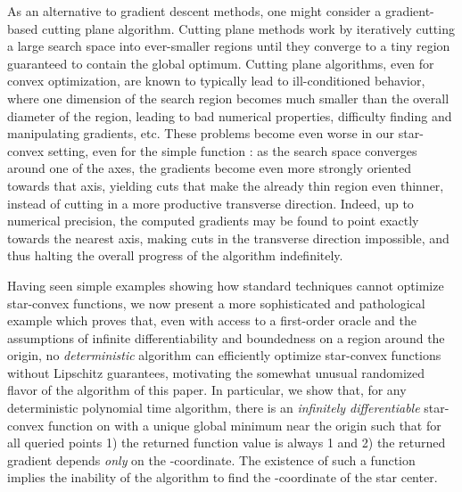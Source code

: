 \documentclass[11pt,letter]{article}
\numberwithin{nTheorems}{section}
\begin{document}
As an alternative to gradient descent methods, one might consider a gradient-based cutting plane algorithm. Cutting plane methods work by iteratively cutting a large search space into ever-smaller regions until they converge to a tiny region guaranteed to contain the global optimum. Cutting plane algorithms, even for convex optimization, are known to typically lead to ill-conditioned behavior, where one dimension of the search region becomes much smaller than the overall diameter of the region, leading to bad numerical properties, difficulty finding and manipulating gradients, etc. These problems become even worse in our star-convex setting, even for the simple function : as the search space converges around one of the axes, the gradients become even more strongly oriented towards that axis, yielding cuts that make the already thin region even thinner, instead of cutting in a more productive transverse direction. Indeed, up to numerical precision, the computed gradients may be found to point exactly towards the nearest axis, making cuts in the transverse direction impossible, and thus halting the overall progress of the algorithm indefinitely.

Having seen simple examples showing how standard techniques cannot optimize star-convex functions, we now present a more sophisticated and pathological example which proves that, even with access to a first-order oracle and the assumptions of infinite differentiability and boundedness on a region around the origin, no \emph{deterministic} algorithm can efficiently optimize star-convex functions without Lipschitz guarantees, motivating the somewhat unusual randomized flavor of the algorithm of this paper.
In particular, we show that, for any deterministic polynomial time algorithm, there is an \emph{infinitely differentiable} star-convex function on  with a unique global minimum near the origin such that for all queried points 1) the returned function value is always 1 and 2) the returned gradient depends \emph{only} on the -coordinate.
The existence of such a function implies the inability of the algorithm to find the -coordinate of the star center.
\end{document}
